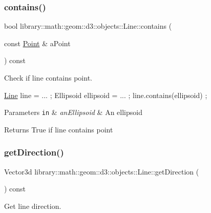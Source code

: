 \subsubsection{\texorpdfstring{contains()}{contains()}}
{\footnotesize\ttfamily bool library\+::math\+::geom\+::d3\+::objects\+::\+Line\+::contains (\begin{DoxyParamCaption}\item[{const \hyperlink{classlibrary_1_1math_1_1geom_1_1d3_1_1objects_1_1_point}{Point} \&}]{a\+Point }\end{DoxyParamCaption}) const}



Check if line contains point. 


\begin{DoxyCode}
\hyperlink{classlibrary_1_1math_1_1geom_1_1d3_1_1objects_1_1_line_a762e529453ff9ffa9233fd73737f4692}{Line} line = ... ;
Ellipsoid ellipsoid = ... ;
line.contains(ellipsoid) ;
\end{DoxyCode}



\begin{DoxyParams}[1]{Parameters}
\mbox{\tt in}  & {\em an\+Ellipsoid} & An ellipsoid \\
\hline
\end{DoxyParams}
\begin{DoxyReturn}{Returns}
True if line contains point 
\end{DoxyReturn}
\mbox{\label{classlibrary_1_1math_1_1geom_1_1d3_1_1objects_1_1_line_aa108a53227e4326188fe17a03c55f9cb}} 
\subsubsection{\texorpdfstring{get\+Direction()}{getDirection()}}
{\footnotesize\ttfamily Vector3d library\+::math\+::geom\+::d3\+::objects\+::\+Line\+::get\+Direction (\begin{DoxyParamCaption}{ }\end{DoxyParamCaption}) const}



Get line direction. 


